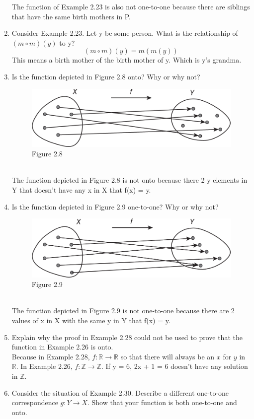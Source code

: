 \documentclass[12pt]{article}
\begin{document}
\begin{enumerate}
      The function of Example 2.23 is also not one-to-one because there are siblings that have the same birth mothers in P.
      \newpage
      \item Consider Example 2.23. Let y be some person. What is the relationship of $(m \circ m) (y)$ to y?
      \[(m \circ m) (y) = m(m(y))\]
      This means a birth mother of the birth mother of y. Which is y's grandma.
      \item Is the function depicted in Figure 2.8 onto? Why or why not?\\
      \begin{figure}[ht]
            \centering
                 \includegraphics[width=1.0\textwidth]{img/Figure2-8.png}
                  Figure 2.8
                  \label{normal_case}
      \end{figure}\\
      The function depicted in Figure 2.8 is not onto because there 2 y elements in Y that doesn't have any x in X that f(x) = y.
      \item Is the function depicted in Figure 2.9 one-to-one? Why or why not?\\
      \begin{figure}[ht]
            \centering
                 \includegraphics[width=1.0\textwidth]{img/Figure2-9.png}
                  Figure 2.9
                  \label{normal_case}
      \end{figure}\\
      The function depicted in Figure 2.9 is not one-to-one because there are 2 values of x in X with the same y in Y that f(x) = y.
      \item Explain why the proof in Example 2.28 could not be used to prove that the function in Example 2.26 is onto.\\
      Because in Example 2.28, $f:\mathds{R} \longrightarrow \mathds{R}$ so that there will always be an $x$ for $y$ in $\mathds{R}$.
      In Example 2.26, $f:\mathds{Z} \longrightarrow \mathds{Z}$. If y = 6, 2x + 1 = 6 doesn't have any solution in $\mathds{Z}$.
      \item Consider the situation of Example 2.30. Describe a different one-to-one correspondence $g: Y \longrightarrow X$. Show that your function is both one-to-one and onto.\\

\end{enumerate}
\end{document}
